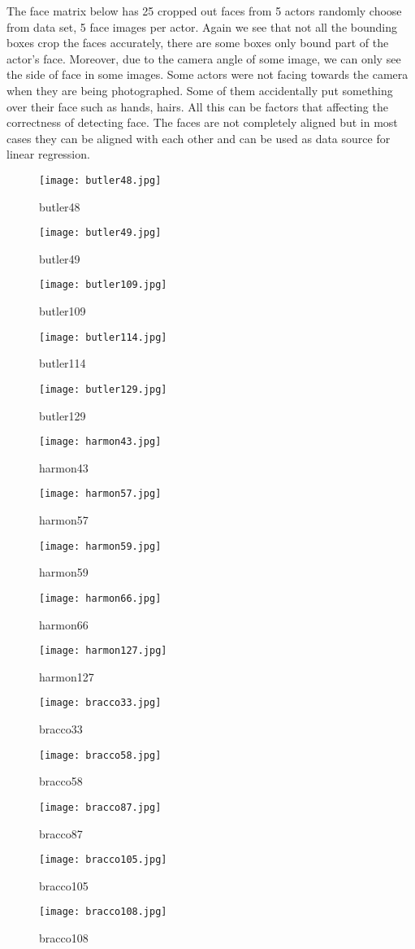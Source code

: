\documentclass{article}
\begin{document}
\noindent The face matrix below has 25 cropped out faces from 5 actors randomly choose from data set, 5 face images per actor. Again we see that not all the bounding boxes crop the faces accurately, there are some boxes only bound part of the actor's face. Moreover, due to the camera angle of some image, we can only see the side of face in some images. Some actors were not facing towards the camera when they are being photographed. Some of them accidentally put something over their face such as hands, hairs. All this can be factors that affecting the correctness of detecting face. The faces are not completely aligned but in most cases they can be aligned with each other and can be used as data source for linear regression.
\begin{figure}[!htb]
  \texttt{[image: butler48.jpg]}
  \caption*{butler48}\label{fig:baldwin}
\endminipage\hfill
{}
  \texttt{[image: butler49.jpg]}
  \caption*{butler49}\label{fig:baldwin}
\endminipage\hfill
{}
  \texttt{[image: butler109.jpg]}
  \caption*{butler109}\label{fig:baldwin}
\endminipage\hfill
{}
  \texttt{[image: butler114.jpg]}
  \caption*{butler114}\label{fig:baldwin}
\endminipage\hfill
{}
  \texttt{[image: butler129.jpg]}
  \caption*{butler129}\label{fig:baldwin}
\endminipage

\end{figure}

\begin{figure}[!htb]
  \texttt{[image: harmon43.jpg]}
  \caption*{harmon43}\label{fig:ferrera}
\endminipage\hfill
{}
  \texttt{[image: harmon57.jpg]}
  \caption*{harmon57}\label{fig:ferrera}
\endminipage\hfill
{}
  \texttt{[image: harmon59.jpg]}
  \caption*{harmon59}\label{fig:ferrera}
\endminipage\hfill
{}
  \texttt{[image: harmon66.jpg]}
  \caption*{harmon66}\label{fig:ferrera}
\endminipage\hfill
{}
  \texttt{[image: harmon127.jpg]}
  \caption*{harmon127}\label{fig:ferrera}
\endminipage
\end{figure}

\begin{figure}[!htb]
  \texttt{[image: bracco33.jpg]}
  \caption*{bracco33}\label{fig:hader}
\endminipage\hfill
{}
  \texttt{[image: bracco58.jpg]}
  \caption*{bracco58}\label{fig:hader}
\endminipage\hfill
{}
  \texttt{[image: bracco87.jpg]}
  \caption*{bracco87}\label{fig:hader}
\endminipage\hfill
{}
  \texttt{[image: bracco105.jpg]}
  \caption*{bracco105}\label{fig:hader}
\endminipage\hfill
{}
  \texttt{[image: bracco108.jpg]}
  \caption*{bracco108}\label{fig:hader}
\endminipage
\end{figure}
\end{document}
